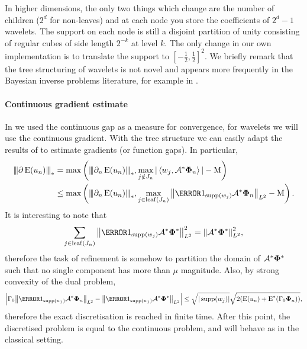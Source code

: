 \documentclass[10pt,a4paper,onecolumn]{article} \usepackage[latin1]{inputenc}
\numberwithin{equation}{section}
\newcommand{\Norm}[1]{{\left\vert\kern-0.25ex\left\vert\kern-0.25ex\left\vert #1 \right\vert\kern-0.25ex\right\vert\kern-0.25ex\right\vert}}
\newcommand{\norm}[1]{{\left\lVert #1 \right\rVert}}
\newcommand{\IP}[2]{\left\langle #1,#2 \right\rangle}\newcommand{\ip}[2]{#1 \vcenter{\hbox{\resizebox{6pt}{!}{\ensuremath\cdot}}} #2}
\newcommand{\op}[1]{\operatorname{#1}}\newcommand{\overtext}[2]{\stackrel{\text{#1}}{#2}}
\renewcommand{\vec}{\mathbf}
\newcommand*{\Func}[1]{%
	\IfEqCase{#1}{%
		{0}{\op{E}}%
		{1}{\op{F}}%
		{2}{\op{G}}%
		{3}{\op{H}}%
	}[\op{F}#1]%
}
\newcommand*{\varf}[1]{%
	\IfEqCase{#1}{%
		{0}{u}%
		{1}{v}%
		{2}{w}%
	}[u#1]%
}
\newcommand*{\vard}[1]{%
	\IfEqCase{#1}{%
		{0}{\varphi}%
		{1}{\psi}%
	}[\varphi #1]%
}
\newcommand*{\vars}[1]{%
	\IfEqCase{#1}{%
		{0}{\alpha}%
		{1}{\beta}%
		{2}{\gamma}%
		{3}{a}%
		{4}{b}%
		{5}{c}%
	}[k#1]%
}
\newcommand*{\data}[1]{%
	\IfEqCase{#1}{%
		{0}{\eta}%
		{1}{\nu}%
	}[g]%
}
\newcommand*{\vvard}[1]{\vec{\vard{#1}}}\newcommand*{\vdata}[1]{\vec{\data{#1}}}
\begin{document}
In higher dimensions, the only two things which change are the number of children ($2^d$ for non-leaves) and at each node you store the coefficients of $2^d-1$ wavelets. The support on each node is still a disjoint partition of unity consisting of regular cubes of side length $2^{-k}$ at level $k$. The only change in our own implementation is to translate the support to $[-\tfrac12,\tfrac12]^2$. We briefly remark that the tree structuring of wavelets is not novel and appears more frequently in the Bayesian inverse problems literature, for example in \cite{Castillo2019}.

\paragraph{Continuous gradient estimate}
In  we used the continuous gap as a measure for convergence, for wavelets we will use the continuous gradient. With the tree structure we can easily adapt the results of  to estimate gradients (or function gaps). In particular,
\begin{align}
	\Norm{\partial \Func0(\varf0_n)}_* &=\max\left(\Norm{\partial_n\Func0(\varf0_n)}_*, \max_{j\notin J_n} |\IP{w_j}{\A^*\vvard0_n}| -\mu \right) \\&\leq\max\left(\Norm{\partial_n\Func0(\varf0_n)}_*, \max_{j\in \op{leaf}(J_n)} \norm{\1_{\supp(w_j)}\A^*\vvard0_n}_{L^2} -\mu \right).\label{eq:ca: wavelet error metric}
\end{align}
It is interesting to note that 
$$\sum_{j\in\op{leaf}(J_n)} \norm{\1_{\supp(w_j)}\A^*\vvard0^*}_{L^2}^2 = \norm{\A^*\vvard0^*}_{L^2}^2,$$
therefore the task of refinement is somehow to partition the domain of $\A^*\vvard0^*$ such that no single component has more than $\mu$ magnitude. Also, by strong convexity of the dual problem,
$$\left|\vars2_0\norm{\1_{\supp(w_j)}\A^*\vvard0_n}_{L^2} - \norm{\1_{\supp(w_j)}\A^*\vvard0^*}_{L^2}\right| \leq \sqrt{|\supp(w_j)|}\sqrt{2(\Func0(\varf0_n)+\Func0^*(\vars2_0\vvard0_n))},$$
therefore the exact discretisation is reached in finite time. After this point, the discretised problem is equal to the continuous problem, and  will behave as in the classical setting.
\end{document}
